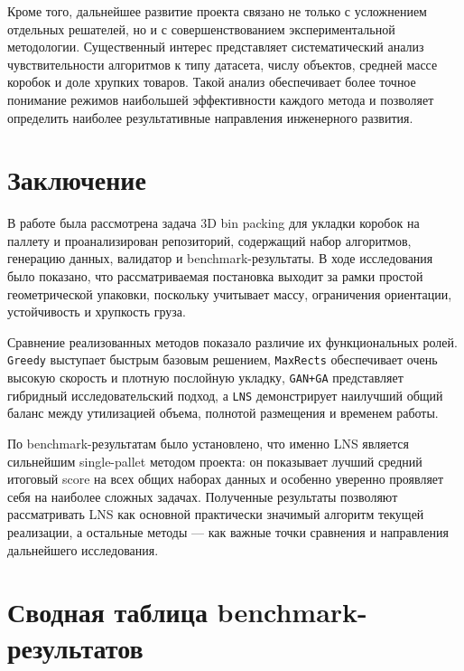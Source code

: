 \documentclass[14pt,a4paper]{extarticle}
\begin{document}
Кроме того, дальнейшее развитие проекта связано не только с усложнением отдельных решателей, но и с совершенствованием экспериментальной методологии. Существенный интерес представляет систематический анализ чувствительности алгоритмов к типу датасета, числу объектов, средней массе коробок и доле хрупких товаров. Такой анализ обеспечивает более точное понимание режимов наибольшей эффективности каждого метода и позволяет определить наиболее результативные направления инженерного развития.

\pagebreak

\section{Заключение}

В работе была рассмотрена задача 3D bin packing для укладки коробок на паллету и проанализирован репозиторий, содержащий набор алгоритмов, генерацию данных, валидатор и benchmark-результаты. В ходе исследования было показано, что рассматриваемая постановка выходит за рамки простой геометрической упаковки, поскольку учитывает массу, ограничения ориентации, устойчивость и хрупкость груза.

Сравнение реализованных методов показало различие их функциональных ролей. \texttt{Greedy} выступает быстрым базовым решением, \texttt{MaxRects} обеспечивает очень высокую скорость и плотную послойную укладку, \texttt{GAN+GA} представляет гибридный исследовательский подход, а \texttt{LNS} демонстрирует наилучший общий баланс между утилизацией объема, полнотой размещения и временем работы.

По benchmark-результатам было установлено, что именно LNS является сильнейшим single-pallet методом проекта: он показывает лучший средний итоговый score на всех общих наборах данных и особенно уверенно проявляет себя на наиболее сложных задачах. Полученные результаты позволяют рассматривать LNS как основной практически значимый алгоритм текущей реализации, а остальные методы --- как важные точки сравнения и направления дальнейшего исследования.

\appendix
\section{Сводная таблица benchmark-результатов}
\end{document}
